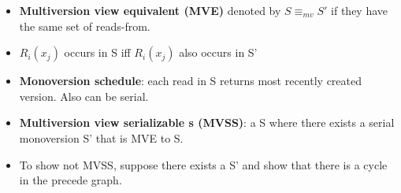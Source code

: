 \documentclass[8pt, landscape]{extarticle}
\begin{document}
\begin{multicols*}{4}
  \begin{itemize}
    \item \textbf{Multiversion view equivalent (MVE)} denoted by $S \equiv_{mv} S'$ if they have the same set of reads-from.
    \item $R_i(x_j)$ occurs in S iff $R_i(x_j)$ also occurs in S'
    \item \textbf{Monoversion schedule}: each read in S returns most recently created version. Also can be serial.
    \item \textbf{Multiversion view serializable s (MVSS)}: a S where there exists a serial monoversion S' that is MVE to S.
    \item To show not MVSS, suppose there exists a S' and show that there is a cycle in the precede graph.
  \end{itemize}


\end{multicols*}
\end{document}
